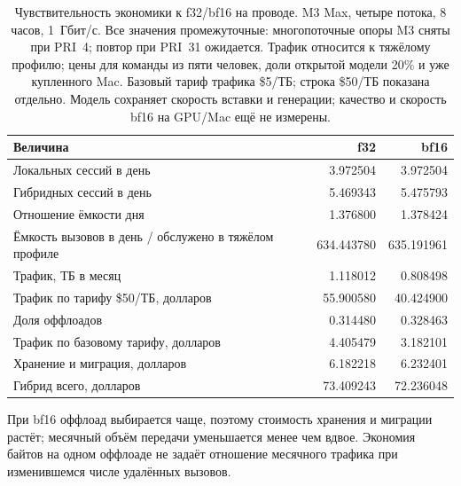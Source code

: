 \begin{table}[t]
\centering
\caption{Чувствительность экономики к f32/bf16 на проводе. M3 Max, четыре потока, 8 часов, 1~Гбит/с.
Все значения промежуточные: многопоточные опоры M3 сняты при PRI~4; повтор при PRI~31 ожидается.
Трафик относится к тяжёлому профилю; цены для команды из пяти человек, доли открытой модели 20\% и уже купленного Mac.
Базовый тариф трафика \$5/ТБ; строка \$50/ТБ показана отдельно. Модель сохраняет скорость вставки и генерации;
качество и скорость bf16 на GPU/Mac ещё не измерены.}
\label{tab:bf16-economics}
\footnotesize
\begin{tabular}{lrr}
\toprule
Величина & f32 & bf16 \\
\midrule
Локальных сессий в день & 3.972504 & 3.972504 \\
Гибридных сессий в день & 5.469343 & 5.475793 \\
Отношение ёмкости дня & 1.376800 & 1.378424 \\
Ёмкость вызовов в день / обслужено в тяжёлом профиле & 634.443780 & 635.191961 \\
Трафик, ТБ в месяц & 1.118012 & 0.808498 \\
Трафик по тарифу \$50/ТБ, долларов & 55.900580 & 40.424900 \\
Доля оффлоадов & 0.314480 & 0.328463 \\
Трафик по базовому тарифу, долларов & 4.405479 & 3.182101 \\
Хранение и миграция, долларов & 6.182218 & 6.232401 \\
Гибрид всего, долларов & 73.409243 & 72.236048 \\
\bottomrule
\end{tabular}
\end{table}

При bf16 оффлоад выбирается чаще, поэтому стоимость хранения и миграции растёт;
месячный объём передачи уменьшается менее чем вдвое. Экономия байтов на одном оффлоаде
не задаёт отношение месячного трафика при изменившемся числе удалённых вызовов.

